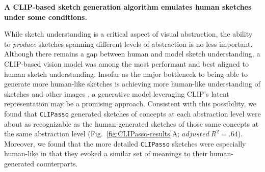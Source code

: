 \documentclass{article}
\begin{document}
\textbf{A CLIP-based sketch generation algorithm emulates human sketches under some conditions.}

While sketch understanding is a critical aspect of visual abstraction, the ability to \textit{produce} sketches spanning different levels of abstraction is no less important.
Although there remains a gap between human and model sketch understanding, a CLIP-based vision model \cite{radford2021learning} was among the most performant and best aligned to human sketch understanding. 
Insofar as the major bottleneck to being able to generate more human-like sketches is achieving more human-like understanding of sketches and other images \cite{fan2018common}, a generative model leveraging CLIP's latent representation may be a promising approach. %
Consistent with this possibility, we found that \texttt{CLIPasso} generated sketches of concepts at each abstraction level were about as recognizable as the human-generated sketches of those same concepts at the same abstraction level (Fig.~\ref{fig:CLIPasso-results}A; $adjusted \: R^2 = .64$).
Moreover, we found that the more detailed \texttt{CLIPasso} sketches were especially human-like in that they evoked a similar set of meanings to their human-generated counterparts.
\end{document}
